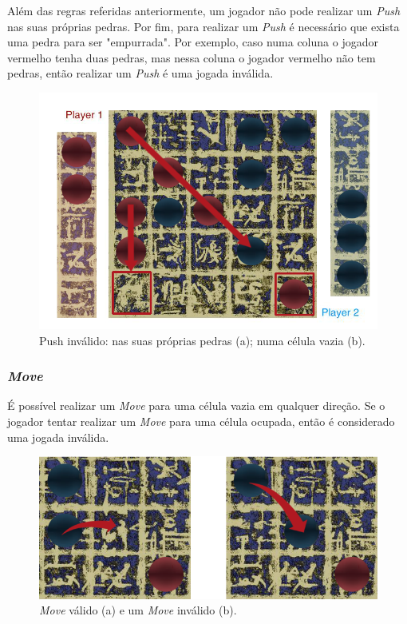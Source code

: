 \documentclass[a4paper]{article}
\begin{document}
Além das regras referidas anteriormente, um jogador não pode realizar um  \textit{Push} nas suas próprias pedras.
Por fim, para realizar um \textit{Push} é necessário que exista uma pedra para ser "empurrada". Por exemplo, caso numa coluna o jogador vermelho tenha duas pedras, mas nessa coluna o jogador vermelho não tem pedras, então realizar um  \textit{Push} é uma jogada inválida.

\begin{figure}[!htb]
	\centering
	\includegraphics[scale=0.3]{images/invalid_push.png} 
	\caption{Push inválido: nas suas próprias pedras (a); numa célula vazia (b).}
\end{figure}

\newpage

\subsubsection{\textit{Move}}

É possível realizar um  \textit{Move} para uma célula vazia em qualquer direção. Se o jogador tentar realizar um \textit{Move} para uma célula ocupada, então é considerado uma jogada inválida.

\begin{figure}[!htb]
	\centering
	\includegraphics[scale=0.2]{images/valid_invalid_move.png} 
	\caption{\textit{Move} válido (a) e um \textit{Move} inválido (b).}
\end{figure}
\end{document}
